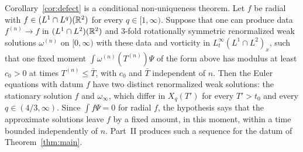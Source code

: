 \begin{remark}
\label{rem:conditional}
Corollary~\ref{cor:defect} is a conditional non-uniqueness theorem. Let $f$ be
radial with $f\in (L^1\cap L^q)(\mathbb{R}^2)$ for every $q\in[1,\infty)$. Suppose that one
can produce data $f^{(n)}\to f$ in $(L^1\cap L^2)(\mathbb{R}^2)$ and $3$-fold rotationally
symmetric renormalized weak solutions $\omega^{(n)}$ on $[0,\infty)$ with these
data and vorticity in $L^\infty_t(L^1\cap L^2)_x$, such that one fixed moment
$\int\omega^{(n)}(T^{(n)})\Psi$ of the form above has modulus at least $c_0>0$ at
times $T^{(n)}\le\bar T$, with $c_0$ and $\bar T$ independent of $n$. Then the
Euler equations with datum $f$ have two distinct renormalized weak solutions: the
stationary solution $f$ and $\omega_\infty$, which differ in $X_q(T')$ for every
$T'>t_0$ and every $q\in(4/3,\infty)$. Since $\int f\Psi=0$ for radial $f$, the
hypothesis says that the approximate solutions leave $f$ by a fixed amount, in
this moment, within a time bounded independently of $n$. Part~II
\cite{PartII} produces such a sequence for the datum of Theorem~\ref{thm:main}.
\end{remark}
